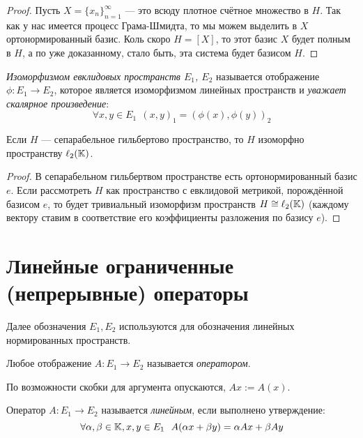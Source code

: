 \begin{proof}
	Пусть $X = \{x_n\}_{n = 1}^\infty$ --- это всюду плотное счётное множество в $H$. Так как у нас имеется процесс Грама-Шмидта, то мы можем выделить в $X$ ортонормированный базис. Коль скоро $H = [X]$, то этот базис $X$ будет полным в $H$, а по уже доказанному, стало быть, эта система будет базисом $H$.
\end{proof}

\begin{definition}
	\textit{Изоморфизмом евклидовых пространств $E_1$, $E_2$} называется отображение $\phi \colon E_1 \to E_2$, которое является изоморфизмом линейных пространств и \textit{уважает скалярное произведение}:
	\[
		\forall x, y \in E_1\ \ (x, y)_1 = (\phi(x), \phi(y))_2
	\]
\end{definition}

\begin{theorem}
	Если $H$ --- сепарабельное гильбертово пространство, то $H$ изоморфно пространству $\ell_2(\mathbb{K})$.
\end{theorem}

\begin{proof}
	В сепарабельном гильбертвом пространстве есть ортонормированный базис $e$. Если рассмотреть $H$ как пространство с евклидовой метрикой, порождённой базисом $e$, то будет тривиальный изоморфизм пространств $H \cong \ell_2(\mathbb{K})$ (каждому вектору ставим в соответствие его коэффициенты разложения по базису $e$).
\end{proof}

\section{Линейные ограниченные (непрерывные) операторы}

\begin{note}
	Далее обозначения $E_1, E_2$ используются для обозначения линейных нормированных пространств.
\end{note}

\begin{definition}
	Любое отображение $A \colon E_1 \to E_2$ называется \textit{оператором}.
\end{definition}

\begin{reminder}
	По возможности скобки для аргумента опускаются, $Ax := A(x)$.
\end{reminder}

\begin{definition}
	Оператор $A \colon E_1 \to E_2$ называется \textit{линейным}, если выполнено утверждение:
	\[
		\forall \alpha, \beta \in \K, x ,y \in E_1\ \ A(\alpha x + \beta y) = \alpha Ax + \beta Ay
	\]
\end{definition}

